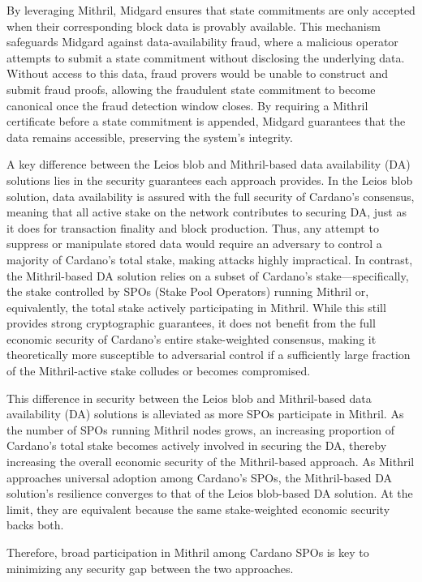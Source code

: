 \documentclass[../midgard.tex]{subfiles}
\begin{document}
By leveraging Mithril, Midgard ensures that state commitments are only accepted when their corresponding block data is provably available.
This mechanism safeguards Midgard against data-availability fraud, where a malicious operator attempts to submit a state commitment without disclosing the underlying data.
Without access to this data, fraud provers would be unable to construct and submit fraud proofs, allowing the fraudulent state commitment to become canonical once the fraud detection window closes.
By requiring a Mithril certificate before a state commitment is appended, Midgard guarantees that the data remains accessible, preserving the system's integrity.

A key difference between the Leios blob and Mithril-based data availability (DA) solutions lies in the security guarantees each approach provides.
In the Leios blob solution, data availability is assured with the full security of Cardano's consensus, meaning that all active stake on the network contributes to securing DA, just as it does for transaction finality and block production.
Thus, any attempt to suppress or manipulate stored data would require an adversary to control a majority of Cardano's total stake, making attacks highly impractical.
In contrast, the Mithril-based DA solution relies on a subset of Cardano's stake—specifically, the stake controlled by SPOs (Stake Pool Operators) running Mithril or, equivalently, the total stake actively participating in Mithril.
While this still provides strong cryptographic guarantees, it does not benefit from the full economic security of Cardano's entire stake-weighted consensus, making it theoretically more susceptible to adversarial control if a sufficiently large fraction of the Mithril-active stake colludes or becomes compromised.

This difference in security between the Leios blob and Mithril-based data availability (DA) solutions is alleviated as more SPOs participate in Mithril.
As the number of SPOs running Mithril nodes grows, an increasing proportion of Cardano's total stake becomes actively involved in securing the DA, thereby increasing the overall economic security of the Mithril-based approach.
As Mithril approaches universal adoption among Cardano's SPOs, the Mithril-based DA solution's resilience converges to that of the Leios blob-based DA solution.
At the limit, they are equivalent because the same stake-weighted economic security backs both.

Therefore, broad participation in Mithril among Cardano SPOs is key to minimizing any security gap between the two approaches.
\end{document}
